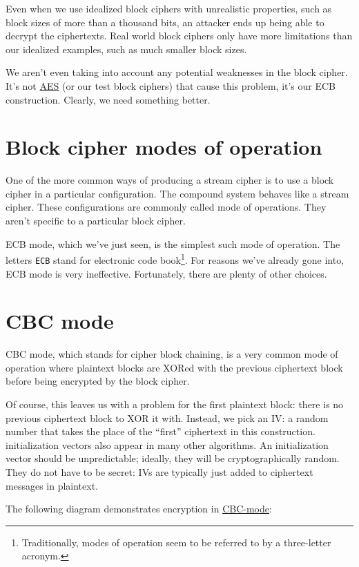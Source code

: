 \documentclass[11pt,ebook,table,dvipsnames]{memoir}
\begin{document}
Even when we use idealized block ciphers with unrealistic properties,
such as block sizes of more than a thousand bits, an attacker ends up
being able to decrypt the ciphertexts. Real world block ciphers only
have more limitations than our idealized examples, such as much
smaller block sizes.

We aren't even taking into account any potential weaknesses in the
block cipher. It's not \hyperref[AES]{AES} (or our test block ciphers) that cause this
problem, it's our ECB construction. Clearly, we need something better.
\section{Block cipher modes of operation}
\label{sec-2-3-3}

One of the more common ways of producing a \gls{stream cipher} is to
use a block cipher in a particular configuration. The compound system
behaves like a stream cipher. These configurations are commonly called
\glspl{mode of operation}. They aren't specific to a particular block
cipher.

\Gls{ECB mode}, which we've just seen, is the simplest such mode of
operation. The letters \verb~ECB~ stand for electronic code book\footnote{Traditionally, modes of operation seem to be referred to by a
three-letter acronym.}. For reasons we've already gone into, ECB mode
is very ineffective. Fortunately, there are plenty of other choices.
\section{\label{CBC-mode}CBC mode}
\label{sec-2-3-4}

\gls{CBC mode}, which stands for cipher block chaining, is a very
common \gls{mode of operation} where plaintext blocks are XORed with
the previous ciphertext block before being encrypted by the block
cipher.

Of course, this leaves us with a problem for the first plaintext
block: there is no previous ciphertext block to XOR it with. Instead,
we pick an \gls{IV}: a random number that takes the place of the
\enquote{first} ciphertext in this construction. \Glspl{initialization vector}
also appear in many other algorithms. An initialization vector should
be unpredictable; ideally, they will be cryptographically random. They
do not have to be secret: IVs are typically just added to ciphertext
messages in plaintext.

The following diagram demonstrates encryption in \hyperref[CBC mode]{CBC-mode}:
\end{document}
